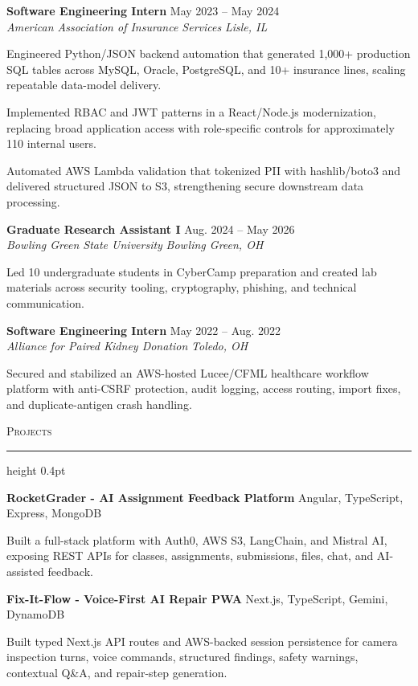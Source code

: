 \documentclass[letterpaper,11pt]{article}
\newcommand{\resumesection}[1]{%
  \par\vspace{2pt}%
  {\large\scshape #1}\par\vspace{2pt}%
  \hrule height 0.4pt\vspace{2pt}%
}
\newcommand{\resumeSubheading}[4]{
  \textbf{#1} \hfill #2\\
  \textit{#3} \hfill \textit{#4}
}
\newcommand{\projectHeading}[2]{
  \textbf{#1} \hfill #2
}
\begin{document}
\resumeSubheading
{Software Engineering Intern}{May 2023 -- May 2024}
{American Association of Insurance Services}{Lisle, IL}
\begin{tightitemize}
  \item Engineered Python/JSON backend automation that generated 1,000+ production SQL tables across MySQL, Oracle, PostgreSQL, and 10+ insurance lines, scaling repeatable data-model delivery.
  \item Implemented RBAC and JWT patterns in a React/Node.js modernization, replacing broad application access with role-specific controls for approximately 110 internal users.
  \item Automated AWS Lambda validation that tokenized PII with hashlib/boto3 and delivered structured JSON to S3, strengthening secure downstream data processing.
\end{tightitemize}

\resumeSubheading
{Graduate Research Assistant I}{Aug. 2024 -- May 2026}
{Bowling Green State University}{Bowling Green, OH}
\begin{tightitemize}
  \item Led 10 undergraduate students in CyberCamp preparation and created lab materials across security tooling, cryptography, phishing, and technical communication.
\end{tightitemize}

\resumeSubheading
{Software Engineering Intern}{May 2022 -- Aug. 2022}
{Alliance for Paired Kidney Donation}{Toledo, OH}
\begin{tightitemize}
  \item Secured and stabilized an AWS-hosted Lucee/CFML healthcare workflow platform with anti-CSRF protection, audit logging, access routing, import fixes, and duplicate-antigen crash handling.
\end{tightitemize}

\resumesection{Projects}
\projectHeading{RocketGrader - AI Assignment Feedback Platform}{Angular, TypeScript, Express, MongoDB}
\begin{tightitemize}
  \item Built a full-stack platform with Auth0, AWS S3, LangChain, and Mistral AI, exposing REST APIs for classes, assignments, submissions, files, chat, and AI-assisted feedback.
\end{tightitemize}

\projectHeading{Fix-It-Flow - Voice-First AI Repair PWA}{Next.js, TypeScript, Gemini, DynamoDB}
\begin{tightitemize}
  \item Built typed Next.js API routes and AWS-backed session persistence for camera inspection turns, voice commands, structured findings, safety warnings, contextual Q\&A, and repair-step generation.
\end{tightitemize}
\end{document}

